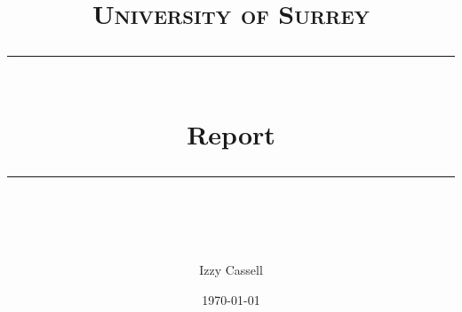 \documentclass[11pt]{scrartcl} %
\title{
    \normalfont\normalsize
    \textsc{University of Surrey}\\ %
    \vspace{25pt} %
    \rule{\linewidth}{0.5pt}\\ %
    \vspace{20pt} %
    {\huge Report}\\ %
    \vspace{12pt} %
    \rule{\linewidth}{2pt}\\ %
}
\author{\LARGE Izzy Cassell} %
\date{\normalsize\today} %
\begin{document}
\maketitle %
\begin{multicols}{2}

\end{multicols}
\end{document}
